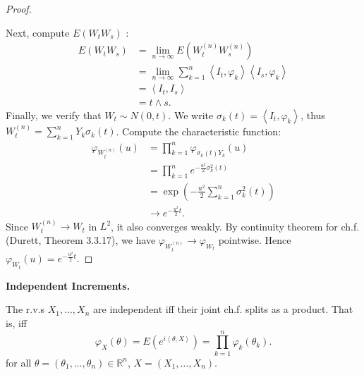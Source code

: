 \begin{proof}
\begin{itemize}
	\end{itemize}
	Next, compute $E(W_t W_s)$ :
	\begin{align*}
		E\left( W_t W_s\right) 
		&= \lim_{n \to \infty} E\left( W_t^{(n)}W_s^{(n)} \right)  \\
		&= \lim_{n \to \infty} \sum_{k=1}^{n} \left\langle I_t, \varphi_k \right\rangle \left\langle I_s, \varphi_k \right\rangle  \\
		&= \left\langle I_t, I_s \right\rangle  \\
		&= t \wedge s 
	.\end{align*}
	Finally, we verify that $W_t \sim N(0,t)$.
	We write $\sigma_k(t) = \left\langle I_t, \varphi_k \right\rangle $, thus $W_t^{(n)} = \sum_{k=1}^{n} Y_k \sigma_k(t)$. Compute the characteristic function:
	\begin{align*}
		\varphi_{W_t^{(n)}}(u)
		&= \prod_{k=1}^{n} \varphi_{\sigma_k(t) Y_k} (u)  \\
		&= \prod_{k=1}^{n} e^{- \frac{u^2}{2}\sigma_k^2(t)}  \\
		&= \exp\left( - \frac{u^2}{2} \sum_{k=1}^{n} \sigma_k^2(t) \right) \\
		&\to e^{- \frac{u^2}{2}t}
	.\end{align*}
	Since $W_t^{(n)}\to W_t$ in $L^2$, it also converges weakly. By continuity theorem for ch.f. (Durett, Theorem 3.3.17), we have $\varphi_{W_t^{(n)}} \to \varphi_{W_t}$ pointwise. Hence $\varphi_{W_t}(u) = e^{- \frac{u^2}{2}t}$.
\end{proof}

\textbf{Independent Increments.} 

\begin{lemma}
	\label{lem:independentChf}
	The r.v.s $X_1, \ldots, X_n$ are independent iff their joint ch.f. splits as a product. That is, iff
	\[
		\varphi_X(\theta) = E\left( e^{i \left\langle \theta, X \right\rangle } \right) = \prod_{k = 1}^{n} \varphi_k(\theta_k) 
	.\] 
	for all $\theta = \left( \theta_1, \ldots, \theta_n \right)  \in \mathbb{R}^n$, $X = \left( X_1, \ldots, X_n \right) $.
\end{lemma}

